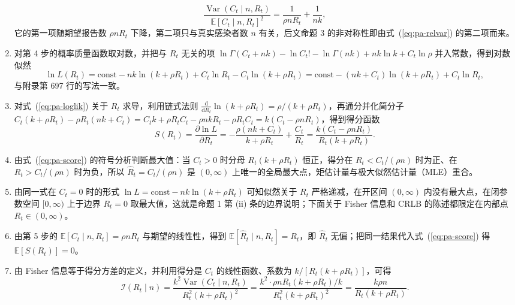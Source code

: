\begin{enumerate}
\begin{equation}
\frac{\operatorname{Var}(C_t\mid n,R_t)}{\mathbb{E}[C_t\mid n,R_t]^2}=\frac{1}{\rho nR_t}+\frac{1}{nk},
\label{eq:pa-relvar}
\end{equation}
它的第一项随期望报告数 $\rho nR_t$ 下降，第二项只与真实感染者数 $n$ 有关，后文命题 3 的非对称性即由式~(\ref{eq:pa-relvar}) 的第二项而来。
\item 对第 4 步的概率质量函数取对数，并把与 $R_t$ 无关的项 $\ln\Gamma(C_t+nk)-\ln C_t!-\ln\Gamma(nk)+nk\ln k+C_t\ln\rho$ 并入常数，得到对数似然
\begin{equation}
\ln L(R_t)=\text{const}-nk\ln(k+\rho R_t)+C_t\ln R_t-C_t\ln(k+\rho R_t)=\text{const}-(nk+C_t)\ln(k+\rho R_t)+C_t\ln R_t,
\label{eq:pa-loglik}
\end{equation}
与附录第 697 行的写法一致。
\item 对式~(\ref{eq:pa-loglik}) 关于 $R_t$ 求导，利用链式法则 $\frac{\mathrm d}{\mathrm dR_t}\ln(k+\rho R_t)=\rho/(k+\rho R_t)$，再通分并化简分子 $C_t(k+\rho R_t)-\rho R_t(nk+C_t)=C_tk+\rho R_tC_t-\rho nkR_t-\rho R_tC_t=k(C_t-\rho nR_t)$，得到得分函数
\begin{equation}
S(R_t)=\frac{\partial\ln L}{\partial R_t}=-\frac{\rho(nk+C_t)}{k+\rho R_t}+\frac{C_t}{R_t}=\frac{k(C_t-\rho nR_t)}{R_t(k+\rho R_t)}.
\label{eq:pa-score}
\end{equation}
\item 由式~(\ref{eq:pa-score}) 的符号分析判断最大值：当 $C_t>0$ 时分母 $R_t(k+\rho R_t)$ 恒正，得分在 $R_t<C_t/(\rho n)$ 时为正、在 $R_t>C_t/(\rho n)$ 时为负，所以 $\widehat{R}_t=C_t/(\rho n)$ 是 $(0,\infty)$ 上唯一的全局最大点，矩估计量与极大似然估计量（MLE）重合。
\item 由同一式在 $C_t=0$ 时的形式 $\ln L=\text{const}-nk\ln(k+\rho R_t)$ 可知似然关于 $R_t$ 严格递减，在开区间 $(0,\infty)$ 内没有最大点，在闭参数空间 $[0,\infty)$ 上于边界 $R_t=0$ 取最大值，这就是命题 1 第 (ii) 条的边界说明；下面关于 Fisher 信息和 CRLB 的陈述都限定在内部点 $R_t\in(0,\infty)$。
\item 由第 5 步的 $\mathbb{E}[C_t\mid n,R_t]=\rho nR_t$ 与期望的线性性，得到 $\mathbb{E}[\widehat{R}_t\mid n,R_t]=R_t$，即 $\widehat{R}_t$ 无偏；把同一结果代入式~(\ref{eq:pa-score}) 得 $\mathbb{E}[S(R_t)]=0$。
\item 由 Fisher 信息等于得分方差的定义，并利用得分是 $C_t$ 的线性函数、系数为 $k/[R_t(k+\rho R_t)]$，可得
\begin{equation*}
\mathcal{I}(R_t\mid n)=\frac{k^2\operatorname{Var}(C_t\mid n,R_t)}{R_t^2(k+\rho R_t)^2}=\frac{k^2\cdot\rho nR_t(k+\rho R_t)/k}{R_t^2(k+\rho R_t)^2}=\frac{k\rho n}{R_t(k+\rho R_t)}.

\end{equation*}
\end{enumerate}
